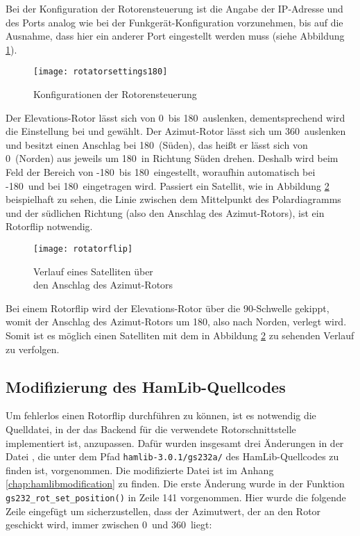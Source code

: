 Bei der Konfiguration der Rotorensteuerung ist die Angabe der IP-Adresse und des Ports analog wie bei der Funkgerät-Konfiguration vorzunehmen, bis auf die Ausnahme, dass hier ein anderer Port eingestellt werden muss (siehe Abbildung \ref{fig:rotatorconfig}). 

\begin{figure}[h]
	\centering
	\texttt{[image: rotatorsettings180]}
	\caption{Konfigurationen der Rotorensteuerung}
	\label{fig:rotatorconfig} 
\end{figure}

Der Elevations-Rotor lässt sich von 0\mydegree\ bis 180\mydegree\ auslenken, dementsprechend wird die Einstellung bei  und  gewählt. Der Azimut-Rotor lässt sich um 360\mydegree\ auslenken und besitzt einen Anschlag bei 180\mydegree\ (Süden), das heißt er lässt sich von 0\mydegree\ (Norden) aus jeweils um 180\mydegree\ in Richtung Süden drehen. Deshalb wird beim Feld  der Bereich von -180\mydegree\ bis 180\mydegree\ eingestellt, woraufhin automatisch bei  -180\mydegree\ und bei  180\mydegree\ eingetragen wird.\newpar
Passiert ein Satellit, wie in Abbildung \ref{fig:rotatorflip} beispielhaft zu sehen, die Linie zwischen dem Mittelpunkt des Polardiagramms und der südlichen Richtung (also den Anschlag des Azimut-Rotors), ist ein Rotorflip notwendig.

\begin{figure}[h]
	\centering
	\texttt{[image: rotatorflip]}
	\caption{Verlauf eines Satelliten über \\den Anschlag des Azimut-Rotors}
	\label{fig:rotatorflip} 
\end{figure}

\newpage

Bei einem Rotorflip wird der Elevations-Rotor über die 90\mydegree-Schwelle gekippt, womit der Anschlag des Azimut-Rotors um 180\mydegree, also nach Norden, verlegt wird. Somit ist es möglich einen Satelliten mit dem in Abbildung \ref{fig:rotatorflip} zu sehenden Verlauf zu verfolgen.

\subsection{Modifizierung des HamLib-Quellcodes}
\label{chap:hamlibmod}

Um fehlerlos einen Rotorflip durchführen zu können, ist es notwendig die Quelldatei, in der das Backend für die verwendete Rotorschnittstelle implementiert ist, anzupassen. Dafür wurden insgesamt drei Änderungen in der Datei , die unter dem Pfad \texttt{hamlib-3.0.1/gs232a/} des HamLib-Quellcodes zu finden ist, vorgenommen. Die modifizierte Datei ist im Anhang \ref{chap:hamlibmodification} zu finden.\newpar
Die erste Änderung wurde in der Funktion \texttt{gs232\_rot\_set\_position()} in Zeile 141 vorgenommen. Hier wurde die folgende Zeile eingefügt um sicherzustellen, dass der Azimutwert, der an den Rotor geschickt wird, immer zwischen 0\mydegree\ und 360\mydegree\ liegt:

